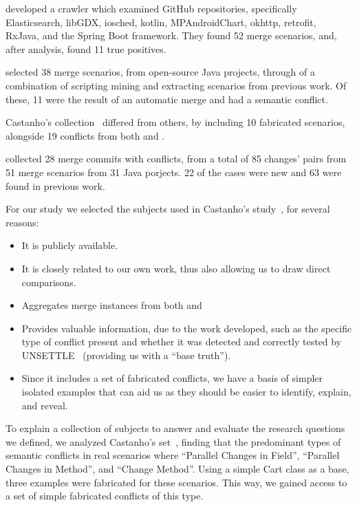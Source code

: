 \citet{kn:safemerge} developed a crawler which examined GitHub repositories, specifically Elasticsearch, libGDX, iosched, kotlin, MPAndroidChart, okhttp, retrofit, RxJava, and the Spring Boot framework. They found 52 merge scenarios,
and, after analysis, found 11 true positives.

\citet{kn:leuson} selected 38 merge scenarios, from open-source Java projects, through of a combination of scripting mining and extracting scenarios from previous work. Of these, 11 were the result of an automatic merge and had a semantic conflict.

Castanho's collection~\cite{kn:nuno} differed from others, by including 10 fabricated scenarios, alongside 19 conflicts from both \citet{kn:safemerge} and \citet{kn:leuson}.

\citet{kn:leuson2} collected 28 merge commits with conflicts, from a total of 85 changes' pairs from 51 merge scenarios from 31 Java porjects. 22 of the cases were new and 63 were found in previous work.

For our study we selected the subjects used in Castanho's study~\cite{kn:nuno}, for several reasons:
\begin{itemize}
  \item It is publicly available.
  \item It is closely related to our own work, thus also allowing us to draw direct comparisons.
  \item Aggregates merge instances from both \citet{kn:leuson} and \citet{kn:safemerge}
  \item Provides valuable information, due to the work developed, such as the specific type of conflict present and whether it was detected and correctly tested by UNSETTLE~\cite{kn:nuno} (providing us with a ``base truth'').
  \item Since it includes a set of fabricated conflicts, we have a basis of simpler isolated examples that can aid us as they should be easier to identify, explain, and reveal.
\end{itemize}

To explain a collection of subjects to answer and evaluate the research questions we defined, we analyzed Castanho's set~\cite{kn:nuno}, finding that the predominant types of semantic
conflicts in real scenarios where ``Parallel Changes in Field'', ``Parallel Changes in Method'',
and ``Change Method''.  Using a simple Cart class as a base, three examples were
fabricated for these scenarios.  This way, we gained access to a set of simple fabricated conflicts of this type.

